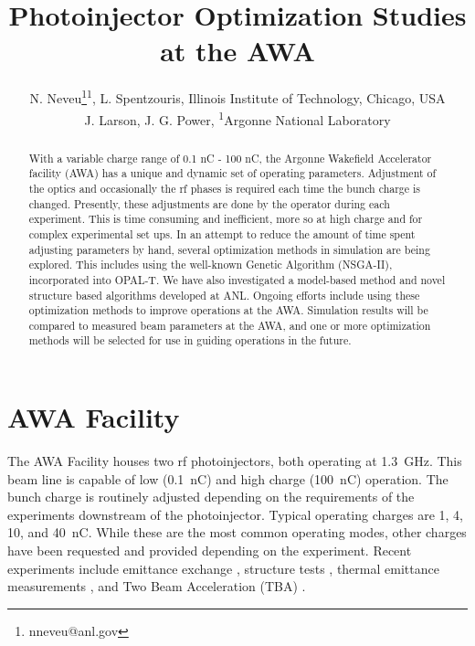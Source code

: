 \documentclass[letterpaper,  %
              ]{jacow-2_3}   %
\begin{document}
\title{Photoinjector Optimization Studies at the AWA}

\author{N. Neveu\thanks{nneveu@anl.gov}\textsuperscript{1}, 
	    L. Spentzouris, Illinois Institute of Technology, Chicago, USA \\
	    J. Larson, J. G. Power, \textsuperscript{1}Argonne National Laboratory}
\maketitle

%
\begin{abstract}
With a variable charge range of 0.1 nC - 100 nC, 
the Argonne Wakefield Accelerator facility (AWA) 
has a unique and dynamic set of operating parameters. 
Adjustment of the optics and occasionally the rf phases is 
required each time the bunch charge is changed. 
Presently, these adjustments are done by the operator during each experiment. 
This is time consuming and inefficient, more so at high charge and for complex experimental set ups.
In an attempt to reduce the amount of time spent adjusting parameters by hand, 
several optimization methods in simulation are being explored. 
This includes using the well-known Genetic Algorithm (NSGA-II),
incorporated into OPAL-T. 
We have also investigated a model-based method and novel
structure based algorithms developed at ANL. 
Ongoing efforts include using these optimization methods to improve operations at the AWA. 
Simulation results will be compared to measured beam parameters at the AWA, 
and one or more optimization methods will be selected for use in guiding operations in the future.
\end{abstract}


\section{AWA Facility}
The AWA Facility houses two rf photoinjectors, both 
operating at \SI{1.3}{GHz}. 
This beam line is capable of low (\SI{0.1}{nC}) and 
high charge (\SI{100}{nC}) operation. The bunch charge is 
routinely adjusted depending on the requirements 
of the experiments downstream of the photoinjector.
Typical operating charges are 1, 4, 10, and \SI{40}{nC}. 
While these are the most
common operating modes, other charges have been requested 
and provided depending on the experiment.
Recent experiments include emittance exchange \cite{eex}, 
structure tests \cite{pets}, thermal emittance measurements \cite{therm}, 
and Two Beam Acceleration (TBA) \cite{tba}. 
\end{document}
